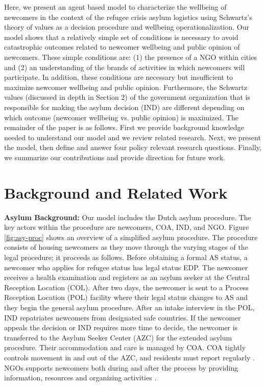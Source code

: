 \documentclass{scspaperproc}
\theoremstyle{scsthe}
\begin{document}

Here, we present an agent based model to characterize the wellbeing of newcomers in the context of the refugee crisis asylum logistics using Schwartz's theory of values as a decision procedure and wellbeing operationalization. Our model shows that a relatively simple set of conditions is necessary to avoid catastrophic outcomes related to newcomer wellbeing and public opinion of newcomers. These simple conditions are: (1) the presence of a NGO within cities and (2) an understanding of the brands of activities in which newcomers will participate. In addition, these conditions are necessary but insufficient to maximize newcomer wellbeing and public opinion. Furthermore, the Schwartz values (discussed in depth in Section 2) of the government organization that is responsible for making the asylum decision (IND) are different depending on which outcome (newcomer wellbeing vs. public opinion) is maximized. The remainder of the paper is as follows. First we provide background knowledge needed to understand our model and we review related research. Next, we present the model, then define and answer four policy relevant research questions. Finally, we summarize our contributions and provide direction for future work.

\section{Background and Related Work}
\label{sec:value-background}
{\bf Asylum Background:} Our model includes the Dutch asylum procedure. The key actors within the procedure are newcomers, COA, IND, and NGO. Figure \ref{fig:asy-proc} shows an overview of a simplified asylum procedure. The procedure consists of housing newcomers as they move through the varying stages of the legal procedure; it proceeds as follows. Before obtaining a formal AS status, a newcomer who applies for refugee status has legal status EDP. The newcomer receives a health examination and registers as an asylum seeker at the Central Reception Location (COL). After two days, the newcomer is sent to a Process Reception Location (POL) facility where their legal status changes to AS and they begin the general asylum procedure. After an intake interview in the POL, IND repatriates newcomers from designated safe countries. If the newcomer appeals the decision or IND requires more time to decide, the newcomer is transferred to the Asylum Seeker Center (AZC) for the extended asylum procedure. Their accommodation and care is managed by COA. COA tightly controls movement in and out of the AZC, and residents must report regularly \cite{9}. NGOs supports newcomers both during and after the process by providing information, resources and organizing activities \cite{94}.
\end{document}
